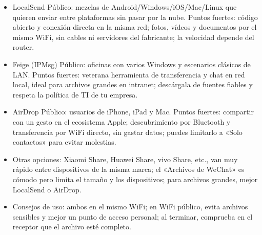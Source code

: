 
\begin{itemize}
  \item LocalSend Público: mezclas de Android/Windows/iOS/Mac/Linux que quieren enviar entre plataformas sin pasar por la nube. Puntos fuertes: código abierto y conexión directa en la misma red; fotos, vídeos y documentos por el mismo WiFi, sin cables ni servidores del fabricante; la velocidad depende del router.
  \item Feige (IPMsg) Público: oficinas con varios Windows y escenarios clásicos de LAN. Puntos fuertes: veterana herramienta de transferencia y chat en red local, ideal para archivos grandes en intranet; descárgala de fuentes fiables y respeta la política de TI de tu empresa.
  \item AirDrop Público: usuarios de iPhone, iPad y Mac. Puntos fuertes: compartir con un gesto en el ecosistema Apple; descubrimiento por Bluetooth y transferencia por WiFi directo, sin gastar datos; puedes limitarlo a «Solo contactos» para evitar molestias.
  \item Otras opciones: Xiaomi Share, Huawei Share, vivo Share, etc., van muy rápido entre dispositivos de la misma marca; el «Archivos de WeChat» es cómodo pero limita el tamaño y los dispositivos; para archivos grandes, mejor LocalSend o AirDrop.
  \item Consejos de uso: ambos en el mismo WiFi; en WiFi público, evita archivos sensibles y mejor un punto de acceso personal; al terminar, comprueba en el receptor que el archivo esté completo.
\end{itemize}


